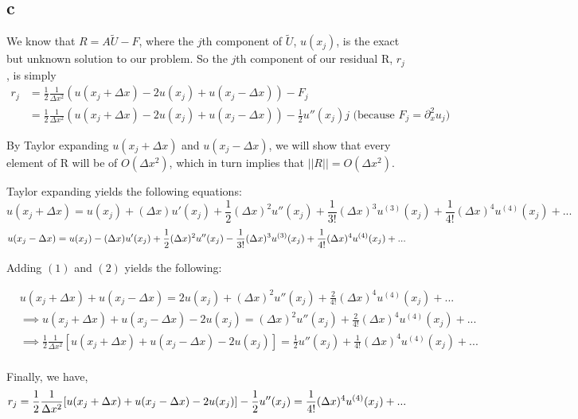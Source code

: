 \documentclass[11pt]{amsart}
\begin{document}
\subsection*{c}
We know that $R = A\tilde{U} - F$, where the $j$th component of $\tilde{U}$, $u(x_j)$, is the exact but unknown solution to our problem. So the $j$th component of our residual R, $r_j$, is simply
\begin{align*}
r_j &= \frac{1}{2} \frac{1}{\Delta x^2}(u(x_j+\Delta x) - 2u(x_j) + u(x_j-\Delta x)) - F_j\\
&=\frac{1}{2} \frac{1}{\Delta x^2}(u(x_j+\Delta x) - 2u(x_j) + u(x_j-\Delta x)) - \frac{1}{2}u''(x_j)j\text{ (because $F_j = \partial_x^2 u_j)$ }
\end{align*} 

By Taylor expanding $u(x_j+\Delta x)$ and $u(x_j-\Delta x)$, we will show that every element of R will be of $O(\Delta x^2)$, which in turn implies that $||R|| = O(\Delta x^2)$.

Taylor expanding yields the following equations:
\begin{equation}
u(x_j + \Delta x) = u(x_j) + (\Delta x)u'(x_j) + \frac{1}{2}(\Delta x)^2 u''(x_j) + \frac{1}{3!}(\Delta x)^3u^{(3)}(x_j) + \frac{1}{4!}(\Delta x)^4u^{(4)}(x_j)+...
\end{equation}
\begin{equation}
\\u(x_j - \Delta x) = u(x_j) - (\Delta x)u'(x_j) + \frac{1}{2}(\Delta x)^2 u''(x_j) - \frac{1}{3!}(\Delta x)^3u^{(3)}(x_j) + \frac{1}{4!}(\Delta x)^4u^{(4)}(x_j)+...
\end{equation}

Adding $(1)$ and $(2)$ yields the following:

\begin{align*}
&u(x_j + \Delta x) + u(x_j - \Delta x) = 2u(x_j) + (\Delta x)^2 u''(x_j) + \frac{2}{4!}(\Delta x)^4u^{(4)}(x_j)+...\\
&\implies u(x_j + \Delta x) + u(x_j - \Delta x) - 2u(x_j) = (\Delta x)^2 u''(x_j) + \frac{2}{4!}(\Delta x)^4u^{(4)}(x_j)+...\\
&\implies \frac{1}{2}\frac{1}{\Delta x^2}[u(x_j + \Delta x) + u(x_j - \Delta x) - 2u(x_j)] = \frac{1}{2}u''(x_j) + \frac{1}{4!}(\Delta x)^4u^{(4)}(x_j)+...\\
\end{align*}

Finally, we have,
\[
r_j = \frac{1}{2}\frac{1}{\Delta x^2}[u(x_j + \Delta x) + u(x_j - \Delta x) - 2u(x_j)] - \frac{1}{2}u''(x_j) =  \frac{1}{4!}(\Delta x)^4u^{(4)}(x_j)+...\\
\]
\end{document}
